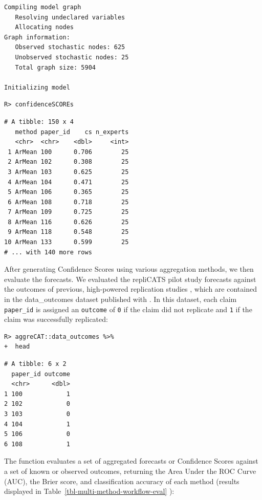 \documentclass[article]{jss}
\newcommand{\fct}[1]{\code{#1()}}
\begin{document}
\begin{verbatim}
Compiling model graph
   Resolving undeclared variables
   Allocating nodes
Graph information:
   Observed stochastic nodes: 625
   Unobserved stochastic nodes: 25
   Total graph size: 5904

Initializing model
\end{verbatim}

\begin{verbatim}
R> confidenceSCOREs
\end{verbatim}

\begin{verbatim}
# A tibble: 150 x 4
   method paper_id    cs n_experts
   <chr>  <chr>    <dbl>     <int>
 1 ArMean 100      0.706        25
 2 ArMean 102      0.308        25
 3 ArMean 103      0.625        25
 4 ArMean 104      0.471        25
 5 ArMean 106      0.365        25
 6 ArMean 108      0.718        25
 7 ArMean 109      0.725        25
 8 ArMean 116      0.626        25
 9 ArMean 118      0.548        25
10 ArMean 133      0.599        25
# ... with 140 more rows
\end{verbatim}

After generating Confidence Scores using various aggregation methods, we
then evaluate the forecasts. We evaluated the repliCATS pilot study
forecasts against the outcomes of previous, high-powered replication
studies \citep{Hanea2021}, which are contained in the {data\_outcomes}
dataset published with . In this dataset, each claim
\texttt{paper\_id} is assigned an \texttt{outcome} of \texttt{0} if the
claim did not replicate and \texttt{1} if the claim was successfully
replicated:

\begin{verbatim}
R> aggreCAT::data_outcomes %>% 
+  head
\end{verbatim}

\begin{verbatim}
# A tibble: 6 x 2
  paper_id outcome
  <chr>      <dbl>
1 100            1
2 102            0
3 103            0
4 104            1
5 106            0
6 108            1
\end{verbatim}

The function \fct{confidence\_score\_evaluation} evaluates a set of
aggregated forecasts or Confidence Scores against a set of known or
observed outcomes, returning the Area Under the ROC Curve (AUC), the
Brier score, and classification accuracy of each method (results
displayed in Table~\ref{tbl-multi-method-workflow-eval} ):
\end{document}
